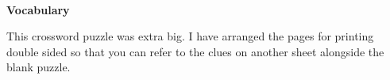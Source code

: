 \documentclass[12pt]{article}
\begin{document}
{\hbox{ \emp  \emp  \emp  \emp  \emp  \emp  \emp  \emp  {}\bx{ }\bx{ }\emp  \bx{ }\emp  \bx{ }\emp  \emp  \bx{ }\emp  \bx{ }\emp  \emp  \emp  \emp  \emp  \emp  \emp  \emp  }
\hbox{ \emp  \emp  \emp  \emp  \emp  \emp  \emp  \emp  \emp  \emp  \bx{ }\emp  \emp  \emp  \bx{ }\emp  \emp  \emp  \emp  \bx{ }\emp  \emp  \emp  \emp  \emp  \emp  \emp  \emp  }
\hbox{ \emp  \emp  \emp  \emp  \emp  \emp  \emp  \emp  \emp  \emp  {}\bx{ }\bx{ }\bx{ }\bx{ }\emp  \emp  \emp  \emp  \bx{ }\emp  \emp  \emp  \emp  \emp  \emp  \emp  \emp  }
\hbox{ \emp  \emp  \emp  \emp  \emp  \emp  \emp  \emp  \emp  \emp  \bx{ }\emp  \emp  \emp  \emp  \emp  \emp  {}\bx{ }\bx{ }\bx{ }\emp  \emp  \emp  \emp  \emp  }
\hbox{ \emp  \emp  \emp  \emp  \emp  \emp  \emp  \emp  \emp  \emp  \emp  \emp  \emp  \emp  \emp  \emp  \emp  \emp  \bx{ }\emp  \emp  \bx{ }\emp  \emp  \emp  \emp  \emp  \emp  }
\hbox{ \emp  \emp  \emp  \emp  \emp  \emp  \emp  \emp  \emp  \emp  \emp  \emp  \emp  \emp  \emp  \emp  \emp  \emp  \bx{ }\emp  \emp  \bx{ }\emp  \emp  \emp  \emp  \emp  \emp  }
\hbox{ \emp  \emp  \emp  \emp  \emp  \emp  \emp  \emp  \emp  \emp  \emp  \emp  \emp  \emp  \emp  \emp  \emp  \emp  \bx{ }\emp  \emp  \bx{ }\emp  \emp  \emp  \emp  \emp  \emp  }
\hbox{ \emp  \emp  \emp  \emp  \emp  \emp  \emp  \emp  \emp  \emp  \emp  \emp  \emp  \emp  \emp  \emp  {}\bx{ }\bx{ }\bx{ }\emp  \bx{ }\emp  \emp  \emp  \emp  \emp  \emp  }
\hbox{ \emp  \emp  \emp  \emp  \emp  \emp  \emp  \emp  \emp  \emp  \emp  \emp  \emp  \emp  \emp  \emp  \emp  \emp  \bx{ }\emp  {}\bx{ }\bx{ }\bx{ }\bx{ }\emp  \emp  \emp  }

}

\newpage 



\textbf{\huge Vocabulary}

\bigskip

\begin{minipage}[t]{10cm}
This crossword puzzle was extra big.  I have arranged the pages for printing double sided so that you can refer to the clues on another sheet alongside the blank puzzle.
\end{minipage}

\bigskip

\setlength{\tabcolsep}{12pt}
\end{document}
